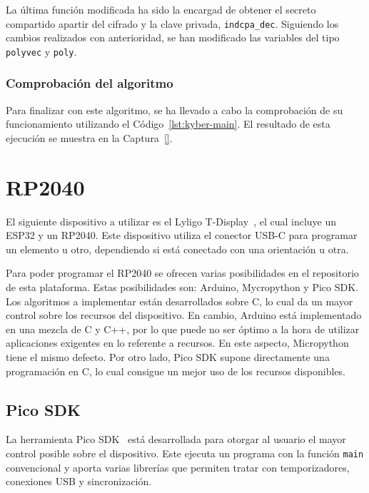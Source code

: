 La última función modificada ha sido la encargad de obtener el secreto compartido apartir del cifrado y la clave privada, \texttt{indcpa\_dec}.
Siguiendo los cambios realizados con anterioridad, se han modificado las variables del tipo \texttt{polyvec} y \texttt{poly}.

\subsubsection{Comprobación del algoritmo}\label{subsubsec:kyber-compro}

Para finalizar con este algoritmo, se ha llevado a cabo la comprobación de su funcionamiento utilizando el Código~\ref{lst:kyber-main}.
El resultado de esta ejecución se muestra en la Captura~\ref{}.





\section{RP2040}\label{sec:rp2040}

El siguiente dispositivo a utilizar es el Lyligo T-Display~\cite{lilygo}, el cual incluye un ESP32 y un RP2040.
Este dispositivo utiliza el conector USB-C para programar un elemento u otro, dependiendo si está conectado con una orientación u otra.

Para poder programar el RP2040 se ofrecen varias posibilidades en el repositorio de esta plataforma.
Estas posibilidades son: Arduino, Mycropython y Pico SDK.
Los algoritmos a implementar están desarrollados sobre C, lo cual da un mayor control sobre los recursos del dispositivo.
En cambio, Arduino está implementado en una mezcla de C y C++, por lo que puede no ser óptimo a la hora de utilizar aplicaciones exigentes en lo referente a recursos.
En este aspecto, Micropython tiene el mismo defecto.
Por otro lado, Pico SDK supone directamente una programación en C, lo cual consigue un mejor uso de los recursos disponibles.


\subsection{Pico SDK}\label{subsec:pico-sdk}

La herramienta Pico SDK~\cite{pico-sdk} está desarrollada para otorgar al usuario el mayor control posible sobre el dispositivo.
Este ejecuta un programa con la función \texttt{main} convencional y aporta varias librerías que permiten tratar con temporizadores, conexiones USB y sincronización.

